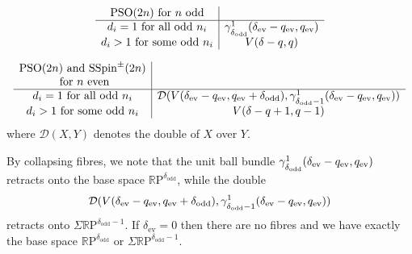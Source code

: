 \documentclass[11pt,a4paper]{article}
\def\SSpin{\mathrm{SSpin}}
\def\PSO{\mathrm{PSO}}
\def\SSpin{\mathrm{SSpin}}
\def\R{\mathbb{R}}
\def\RP{\R\mathrm{P}}
\def\ev{\mathrm{ev}}
\def\odd{\mathrm{odd}}
\def\unitbundle#1#2#3{{\gamma^1\!\!\!\strut_{#1}(#2,#3)}}
\begin{document}
\bigskip

\begin{table}[h]
\[
\begin{array}{c|c}
 \PSO(2n) \text{ for $n$ odd}  \\
\hline
 d_i = 1 \text{ for all odd } n_i& \unitbundle{\delta_\odd}{\delta_\ev-q_\ev}{q_\ev}\\
 d_i > 1  \text{ for some  odd } n_i& V(\delta-q,q)\\
\end{array}
\]


\smallskip

\caption{\label{IIA PSO(2n) n odd}The structure of the sector associated to a conjugacy class with no negative cycles and at least one odd positive cycle in the $\PSO(2n)$ case when $n$ is odd.
}
\end{table}



\begin{table}[h]
\[
\begin{array}{c|c}
 \PSO(2n) \text{ and } \SSpin^\pm(2n)\\ \text{ for $n$ even}  \\
\hline
 d_i = 1 \text{ for all odd } n_i&\mathcal{D}(V(\delta_\ev-q_\ev, q_\ev+\delta_\odd),\unitbundle{\delta_\odd-1}{\delta_\ev-q_\ev}{q_\ev}) \\
 d_i > 1  \text{ for some  odd } n_i& V(\delta-q+1,q-1)\\
\end{array}
\]
where $\mathcal{D}(X,Y)$ denotes the double of $X$ over $Y$.

\smallskip

\caption{\label{IIA PSO(2n)/SSpin(2n) n  even}The structure of the sector associated to a conjugacy class with no negative cycles and at least one odd positive cycle in the $\PSO(2n)$ and $\SSpin^\pm(2n)$ cases when $n$ is even.
}
\end{table}


\bigskip

\noindent By collapsing fibres, we note that the unit ball bundle $\unitbundle{\delta_\odd}{\delta_\ev-q_\ev}{q_\ev}$
retracts onto the base space $\RP^{\delta_\odd}$, while the double 
\[
\mathcal{D}(V(\delta_\ev-q_\ev, q_\ev+\delta_\odd),\unitbundle{\delta_\odd-1}{\delta_\ev-q_\ev}{q_\ev})
\]
retracts onto $\Sigma\RP^{\delta_\odd-1}$. If $\delta_\ev=0$ then there are no fibres and we have exactly the base space $\RP^{\delta_\odd}$ or $\Sigma\RP^{\delta_\odd-1}$.
\end{document}
